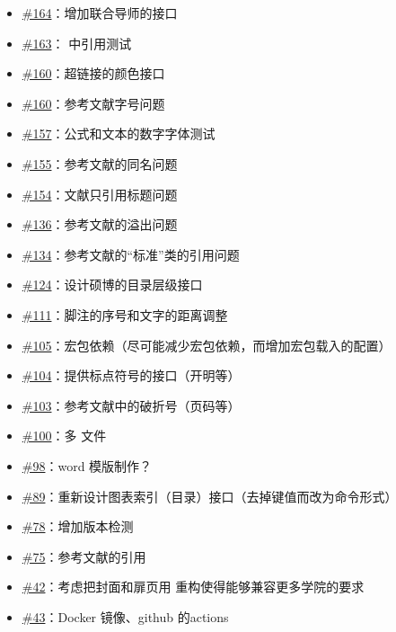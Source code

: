 \begin{itemize}
  \item \href{https://github.com/whutug/whu-thesis/discussions/164}{\#164}：增加联合导师的接口
  \item \href{https://github.com/whutug/whu-thesis/discussions/163}{\#163}： 中引用测试
  \item \href{https://github.com/whutug/whu-thesis/discussions/160}{\#160}：超链接的颜色接口
  \item \href{https://github.com/whutug/whu-thesis/discussions/160}{\#160}：参考文献字号问题
  \item \href{https://github.com/whutug/whu-thesis/discussions/157}{\#157}：公式和文本的数字字体测试
  \item \href{https://github.com/whutug/whu-thesis/discussions/155}{\#155}：参考文献的同名问题
  \item \href{https://github.com/whutug/whu-thesis/discussions/154}{\#154}：文献只引用标题问题
  \item \href{https://github.com/whutug/whu-thesis/discussions/136}{\#136}：参考文献的溢出问题
  \item \href{https://github.com/whutug/whu-thesis/discussions/134}{\#134}：参考文献的“标准”类的引用问题
  \item \href{https://github.com/whutug/whu-thesis/discussions/124}{\#124}：设计硕博的目录层级接口
  \item \href{https://github.com/whutug/whu-thesis/discussions/111}{\#111}：脚注的序号和文字的距离调整
  \item \href{https://github.com/whutug/whu-thesis/discussions/105}{\#105}：宏包依赖（尽可能减少宏包依赖，而增加宏包载入的配置）
  \item \href{https://github.com/whutug/whu-thesis/discussions/104}{\#104}：提供标点符号的接口（开明等）
  \item \href{https://github.com/whutug/whu-thesis/discussions/103}{\#103}：参考文献中的破折号（页码等）
  \item \href{https://github.com/whutug/whu-thesis/discussions/100}{\#100}：多  文件
  \item \href{https://github.com/whutug/whu-thesis/discussions/98}{\#98}：word 模版制作？
  \item \href{https://github.com/whutug/whu-thesis/discussions/89}{\#89}：重新设计图表索引（目录）接口（去掉键值而改为命令形式）
  \item \href{https://github.com/whutug/whu-thesis/discussions/78}{\#78}：增加版本检测
  \item \href{https://github.com/whutug/whu-thesis/discussions/75}{\#75}：参考文献的引用
  \item \href{https://github.com/whutug/whu-thesis/discussions/42}{\#42}：考虑把封面和扉页用  重构使得能够兼容更多学院的要求
  \item \href{https://github.com/whutug/whu-thesis/discussions/43}{\#43}：Docker 镜像、github 的actions
\end{itemize}